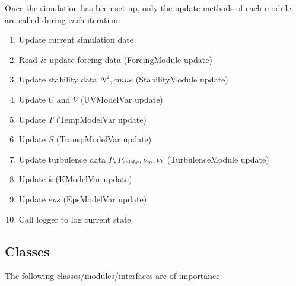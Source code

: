 \documentclass[paper=a4, fontsize=12pt]{article}
\begin{document}
Once the simulation has been set up, only the update methods of each module are called during each iteration:
\begin{enumerate}
	\item Update current simulation date
	\item Read \& update forcing data (ForcingModule update)
	\item Update stability data $N^{2},cmue$ (StabilityModule update)
	\item Update $U$ and $V$ (UVModelVar update)
	\item Update $T$ (TempModelVar update)
	\item Update $S$ (TranspModelVar update)
	\item Update turbulence data $P,P_{seiche},\nu_{m},\nu_{h}$ (TurbulenceModule update)
	\item Update $k$ (KModelVar update)
	\item Update $eps$ (EpsModelVar update)
	\item Call logger to log current state
\end{enumerate}


\subsection{Classes}

The following classes/modules/interfaces are of importance:
\end{document}
